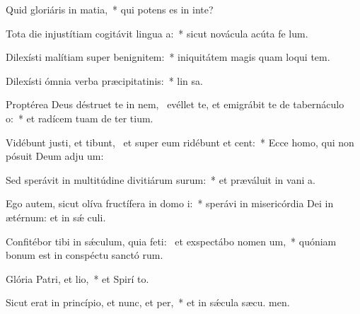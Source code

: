 \item Quid gloriáris in matia,~* qui potens es in inte?
\item Tota die injustítiam cogitávit lingua a:~* sicut novácula acúta fe lum.
\item Dilexísti malítiam super benignitem:~* iniquitátem magis quam loqui tem.
\item Dilexísti ómnia verba præcipitatinis:~* lin sa.
\item Proptérea Deus déstruet te in nem,~\pscross{} evéllet te, et emigrábit te de tabernáculo o:~* et radícem tuam de ter tium.
\item Vidébunt justi, et tibunt,~\pscross{} et super eum ridébunt et cent:~* Ecce homo, qui non pósuit Deum adju um:
\item Sed sperávit in multitúdine divitiárum surum:~* et præváluit in vani a.
\item Ego autem, sicut olíva fructífera in domo i:~* sperávi in misericórdia Dei in ætérnum: et in sǽ culi.
\item Confitébor tibi in sǽculum, quia feti:~\pscross{} et exspectábo nomen um,~* quóniam bonum est in conspéctu sanctó rum.
\item Glória Patri, et lio,~* et Spirí to.
\item Sicut erat in princípio, et nunc, et per,~* et in sǽcula sæcu. men.
